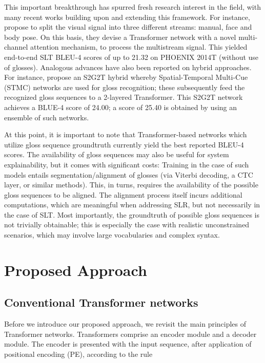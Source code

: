 \documentclass[10pt,twocolumn,letterpaper]{article}
\begin{document}
This important breakthrough has spurred fresh research interest in the field, with many recent works building upon and extending this framework. For instance, \cite{CamgozKHB20b} propose to split the visual signal into three different streams: manual, face and body pose. On this basis, they devise a Transformer network with a novel multi-channel attention mechanism, to process the multistream signal. This yielded end-to-end SLT BLEU-4 scores of up to 21.32 on PHOENIX 2014T (without use of glosses). Analogous advances have also been reported on hybrid approaches. For instance, \cite{yin2020} propose an S2G2T hybrid whereby 
Spatial-Temporal Multi-Cue (STMC) networks \cite{ZhouZZL20} are used for gloss recognition; these subsequently feed the recognized gloss sequences to a 2-layered Transformer. This S2G2T network achieves a BLUE-4 score of 24.00; a score of 25.40 is obtained by using an ensemble of such networks. 

At this point, it is important to note that Transformer-based networks which utilize gloss sequence groundtruth currently yield the best reported BLEU-4 scores. The availability of gloss sequences may also be useful for system explainability, but it comes with significant costs: Training in the case of such models entails segmentation/alignment of glosses (via Viterbi decoding, a CTC layer, or similar methods). This, in turns, requires the availability of the possible gloss sequences to be aligned. The alignment process itself incurs additional computations, which are meaningful when addressing SLR, but not necessarily in the case of SLT. Most importantly, the groundtruth of possible gloss sequences is not trivially obtainable; this is especially the case with realistic unconstrained scenarios, which may involve large vocabularies and complex syntax.

\section{Proposed Approach}
\label{sec:method}

\subsection{Conventional Transformer networks}

Before we introduce our proposed approach, we revisit the main principles of Transformer networks. Transformers comprise an encoder module and a decoder module. The encoder is presented with the input sequence, after application of positional encoding (PE), according to the rule
\end{document}
